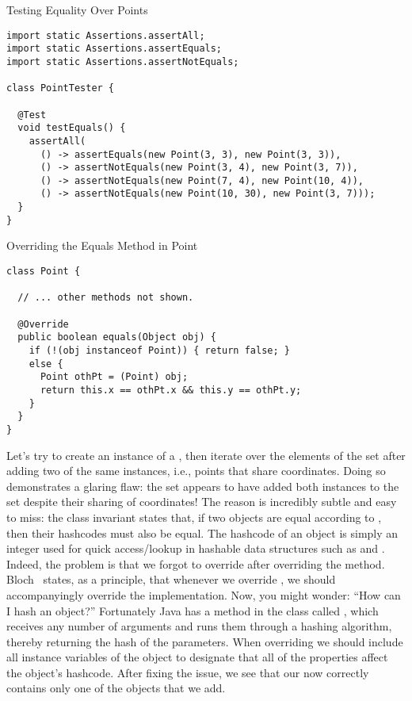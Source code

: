 \begin{cl}[]{Testing Equality Over Points}
\begin{lstlisting}[language=MyJava]
import static Assertions.assertAll;
import static Assertions.assertEquals;
import static Assertions.assertNotEquals;

class PointTester {

  @Test
  void testEquals() {
    assertAll(
      () -> assertEquals(new Point(3, 3), new Point(3, 3)),
      () -> assertNotEquals(new Point(3, 4), new Point(3, 7)),
      () -> assertNotEquals(new Point(7, 4), new Point(10, 4)),
      () -> assertNotEquals(new Point(10, 30), new Point(3, 7)));
  }
}
\end{lstlisting}
\end{cl}

\begin{cl}[]{Overriding the Equals Method in Point}
\begin{lstlisting}[language=MyJava]
class Point {

  // ... other methods not shown.

  @Override
  public boolean equals(Object obj) {
    if (!(obj instanceof Point)) { return false; }
    else {
      Point othPt = (Point) obj;
      return this.x == othPt.x && this.y == othPt.y;
    }
  }
}
\end{lstlisting}
\end{cl}

Let's try to create an instance of a , then iterate over the elements of the set after adding two of the same  instances, i.e., points that share coordinates. Doing so demonstrates a glaring flaw: the set appears to have added both  instances to the set despite their sharing of coordinates! The reason is incredibly subtle and easy to miss: the  class invariant states that, if two objects are equal according to , then their hashcodes must also be equal. The hashcode of an object is simply an integer used for quick access/lookup in hashable data structures such as  and . Indeed, the problem is that we forgot to override  after overriding the  method. Bloch~\cite{effectivejava} states, as a principle, that whenever we override , we should accompanyingly override the  implementation. Now, you might wonder: ``How can I hash an object?'' Fortunately Java has a method in the  class called , which receives any number of arguments and runs them through a hashing algorithm, thereby returning the hash of the parameters. When overriding  we should include all instance variables of the object to designate that all of the properties affect the object's hashcode. After fixing the issue, we see that our  now correctly contains only one of the  objects that we add.

